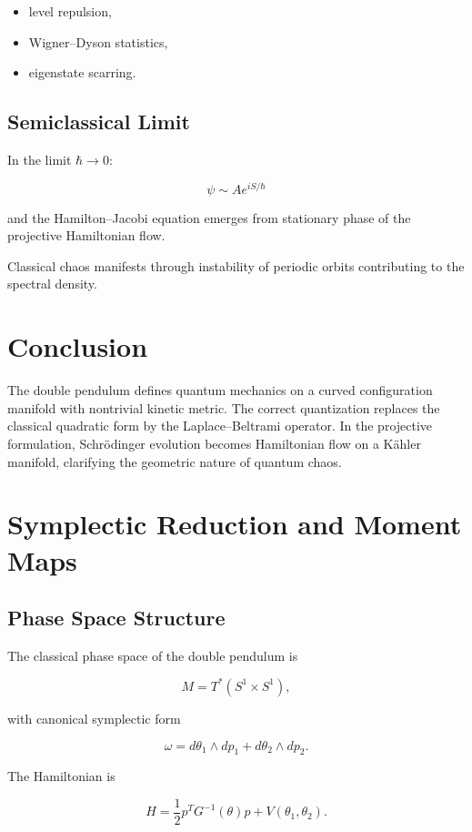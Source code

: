 \documentclass[11pt]{article}
\begin{document}
\begin{itemize}
\item level repulsion,
\item Wigner--Dyson statistics,
\item eigenstate scarring.
\end{itemize}

\subsection{Semiclassical Limit}

In the limit $\hbar \to 0$:

\[
\psi \sim A e^{iS/\hbar}
\]

and the Hamilton--Jacobi equation emerges from
stationary phase of the projective Hamiltonian flow.

Classical chaos manifests through instability of
periodic orbits contributing to the spectral density.

\section{Conclusion}

The double pendulum defines quantum mechanics on a curved
configuration manifold with nontrivial kinetic metric.
The correct quantization replaces the classical quadratic
form by the Laplace--Beltrami operator.
In the projective formulation,
Schr\"odinger evolution becomes Hamiltonian flow on a
K\"ahler manifold,
clarifying the geometric nature of quantum chaos.

\section{Symplectic Reduction and Moment Maps}

\subsection{Phase Space Structure}

The classical phase space of the double pendulum is

\[
M = T^*(S^1 \times S^1),
\]

with canonical symplectic form

\[
\omega = d\theta_1 \wedge dp_1 + d\theta_2 \wedge dp_2.
\]

The Hamiltonian is

\[
H = \frac12 p^T G^{-1}(\theta) p + V(\theta_1,\theta_2).
\]
\end{document}
